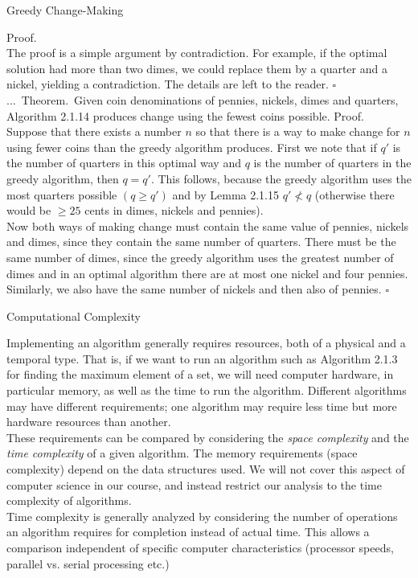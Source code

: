 \documentclass[smaller,hyperref={CJKbookmarks=true}]{beamer}
\newenvironment{PROOF}{{\noindent\!\sf\alert{Proof.}}\\}{\hfill$\square$\\}
\newcounter{zhuo}[subsection]
\renewcommand{\thezhuo}{\thesection.\thesubsection.\arabic{zhuo}}
\newenvironment{THEOREM}{\stepcounter{zhuo}\alert{\thezhuo.~Theorem.\,}}{}
\begin{document}
\begin{frame}{Greedy Change-Making}
\begin{spacing}{1}
\begin{PROOF}
The proof is a simple argument by contradiction. For example, if the
optimal solution had more than two dimes, we could replace them by a
quarter and a nickel, yielding a contradiction. The details are left to the reader.
\end{PROOF}
\vspace*{9pt}
\begin{THEOREM}
Given coin denominations of pennies, nickels, dimes and
quarters, Algorithm 2.1.14 produces change using the fewest coins
possible.
\end{THEOREM}
\newpage
\vspace*{7pt}
\begin{PROOF}
Suppose that there exists a number $n$ so that there is a way to make
change for $n$ using fewer coins than the greedy algorithm produces. First
we note that if $q'$ is the number of quarters in this optimal way and $q$ is
the number of quarters in the greedy algorithm, then $q = q'$. This follows,
because the greedy algorithm uses the most quarters possible $(q\geq q')$ and by Lemma 2.1.15 $q'\nless q$ (otherwise there would be $\geq25$ cents in dimes, nickels and pennies).\\[6pt]
Now both ways of making change must contain the same value of pennies,
nickels and dimes, since they contain the same number of quarters. There
must be the same number of dimes, since the greedy algorithm uses the
greatest number of dimes and in an optimal algorithm there are at most
one nickel and four pennies. Similarly, we also have the same number of
nickels and then also of pennies.
\end{PROOF}
\end{spacing}
\end{frame}
\begin{frame}[t]{Computational Complexity}
\begin{spacing}{1.1}
Implementing an algorithm generally requires resources, both of a physical
and a temporal type. That is, if we want to run an algorithm such as
Algorithm 2.1.3 for finding the maximum element of a set, we will need
computer hardware, in particular memory, as well as the time to run the
algorithm. Different algorithms may have different requirements; one
algorithm may require less time but more hardware resources than another.\\[5pt]
These requirements can be compared by considering the \emph{space complexity}
and the \emph{time complexity} of a given algorithm. The memory requirements
(space complexity) depend on the data structures used. We will not cover
this aspect of computer science in our course, and instead restrict our
analysis to the time complexity of algorithms.\\[5pt]
Time complexity is generally analyzed by considering the number of
operations an algorithm requires for completion instead of actual time.
This allows a comparison independent of specific computer characteristics
(processor speeds, parallel vs. serial processing etc.)
\end{spacing}
\end{frame}
\end{document}
